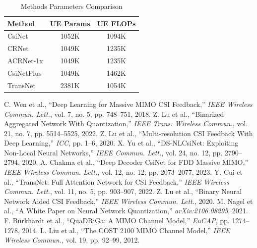 \documentclass[lettersize,journal]{IEEEtran}
\begin{document}
\begin{table}[htb]
  \centering
  \caption{Methods Parameters Comparison}
  \label{table:methods_params}
  \begin{tabular}{lcc}
    \toprule
    \textbf{Method} & \textbf{UE Params} & \textbf{UE FLOPs} \\
    \midrule
    CsiNet & 1052K & 1094K \\
    CRNet & 1049K & 1235K \\
    ACRNet-1x & 1049K & 1235K \\
    CsiNetPlus & 1049K & 1462K \\
    TransNet & 2381K & 1054K \\
    \bottomrule
  \end{tabular}
\end{table}

\begin{thebibliography}{00}
 C. Wen et al., ``Deep Learning for Massive MIMO CSI Feedback,'' \emph{IEEE Wireless Commun. Lett.}, vol. 7, no. 5, pp. 748--751, 2018.
 Z. Lu et al., ``Binarized Aggregated Network With Quantization,'' \emph{IEEE Trans. Wireless Commun.}, vol. 21, no. 7, pp. 5514--5525, 2022.
 Z. Lu et al., ``Multi-resolution CSI Feedback With Deep Learning,'' \emph{ICC}, pp. 1--6, 2020.
 X. Yu et al., ``DS-NLCsiNet: Exploiting Non-Local Neural Networks,'' \emph{IEEE Commun. Lett.}, vol. 24, no. 12, pp. 2790--2794, 2020.
 A. Chakma et al., ``Deep Decoder CsiNet for FDD Massive MIMO,'' \emph{IEEE Wireless Commun. Lett.}, vol. 12, no. 12, pp. 2073--2077, 2023.
 Y. Cui et al., ``TransNet: Full Attention Network for CSI Feedback,'' \emph{IEEE Wireless Commun. Lett.}, vol. 11, no. 5, pp. 903--907, 2022.
 Z. Lu et al., ``Binary Neural Network Aided CSI Feedback,'' \emph{IEEE Wireless Commun. Lett.}, 2020.
 M. Nagel et al., ``A White Paper on Neural Network Quantization,'' \emph{arXiv:2106.08295}, 2021.
 F. Burkhardt et al., ``QuaDRiGa: A MIMO Channel Model,'' \emph{EuCAP}, pp. 1274--1278, 2014.
 L. Liu et al., ``The COST 2100 MIMO Channel Model,'' \emph{IEEE Wireless Commun.}, vol. 19, pp. 92--99, 2012.
\end{thebibliography}
\end{document}

